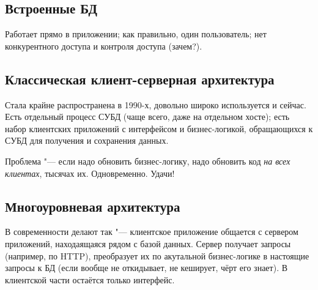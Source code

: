 \subsection{Встроенные БД}
Работает прямо в приложении; как правильно, один пользователь; нет конкурентного доступа и контроля доступа (зачем?).

\subsection{Классическая клиент-серверная архитектура}
Стала крайне распространена в 1990-х, довольно широко используется и сейчас.
Есть отдельный процесс СУБД (чаще всего, даже на отдельном хосте); есть набор клиентских приложений с интерфейсом и бизнес-логикой,
обращающихся к СУБД для получения и сохранения данных.

Проблема "--- если надо обновить бизнес-логику, надо обновить код \textit{на всех клиентах}, тысячах их. Одновременно. Удачи!

\subsection{Многоуровневая архитектура}
В современности делают так "--- клиентское приложение общается с сервером приложений, находаящаяся рядом с базой данных.
Сервер получает запросы (например, по HTTP), преобразует их по акутальной бизнес-логике в настоящие запросы к БД
(если вообще не откидывает, не кеширует, чёрт его знает). В клиентской части остаётся только интерфейс.
